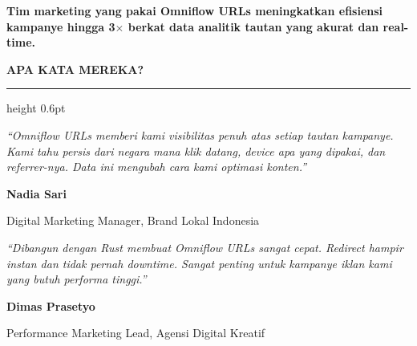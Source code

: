 \documentclass[a4paper]{article}
\newcommand{\sectiontitle}[1]{%
    \vspace{10pt}%
    {\fontsize{13}{16}\selectfont\bfseries\color{BlueDark} #1}\par\vspace{3pt}%
    {\color{BluePrimary}\hrule height 0.6pt}\par\vspace{8pt}%
}
\begin{document}
\vspace{8pt}

{\setlength{\fboxsep}{7pt}\setlength{\fboxrule}{0pt}%
\noindent\colorbox{CyanPrimary}{%
    \begin{minipage}{\dimexpr\textwidth-2\fboxsep\relax}
        \centering
        {\fontsize{9.5}{12}\selectfont\bfseries\color{White}
        Tim marketing yang pakai Omniflow URLs meningkatkan \textbf{efisiensi kampanye hingga 3$\times$} berkat data analitik tautan yang akurat dan real-time.}
    \end{minipage}}}

\vspace{8pt}
\sectiontitle{APA KATA MEREKA?}

\noindent
\begin{minipage}[t]{0.485\textwidth}
    \colorbox{BlueBg}{%
        \begin{minipage}{\dimexpr\linewidth-2\fboxsep\relax}
            {\fontsize{9.5}{13}\selectfont\color{TextDark}\textit{``Omniflow URLs memberi kami visibilitas penuh atas setiap tautan kampanye. Kami tahu persis dari negara mana klik datang, device apa yang dipakai, dan referrer-nya. Data ini mengubah cara kami optimasi konten.''}}\par\vspace{4pt}
            {\fontsize{8.5}{11}\selectfont\bfseries\color{BluePrimary} Nadia Sari}\par
            {\fontsize{8}{10}\selectfont\color{TextLight} Digital Marketing Manager, Brand Lokal Indonesia}
        \end{minipage}}
\end{minipage}%
\hfill
\begin{minipage}[t]{0.485\textwidth}
    \colorbox{BlueBg}{%
        \begin{minipage}{\dimexpr\linewidth-2\fboxsep\relax}
            {\fontsize{9.5}{13}\selectfont\color{TextDark}\textit{``Dibangun dengan Rust membuat Omniflow URLs sangat cepat. Redirect hampir instan dan tidak pernah downtime. Sangat penting untuk kampanye iklan kami yang butuh performa tinggi.''}}\par\vspace{4pt}
            {\fontsize{8.5}{11}\selectfont\bfseries\color{BluePrimary} Dimas Prasetyo}\par
            {\fontsize{8}{10}\selectfont\color{TextLight} Performance Marketing Lead, Agensi Digital Kreatif}
        \end{minipage}}
\end{minipage}
\end{document}
